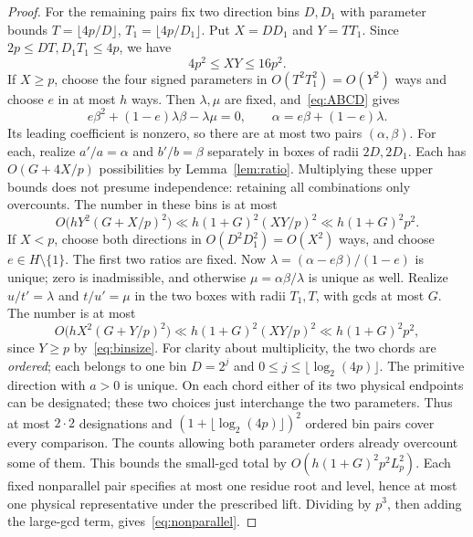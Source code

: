 \begin{proof}
For the remaining pairs fix two direction bins $D,D_1$ with parameter bounds $T=\lfloor4p/D\rfloor$, $T_1=\lfloor4p/D_1\rfloor$. Put $X=DD_1$ and $Y=TT_1$. Since $2p\le DT,D_1T_1\le4p$, we have
\begin{equation}\label{eq:binsize}
 4p^2\le XY\le16p^2.
\end{equation}
If $X\ge p$, choose the four signed parameters in $O(T^2T_1^2)=O(Y^2)$ ways and choose $e$ in at most $h$ ways. Then $\lambda,\mu$ are fixed, and~\eqref{eq:ABCD} gives
\[
 e\beta^2+(1-e)\lambda\beta-\lambda\mu=0,\qquad \alpha=e\beta+(1-e)\lambda.
\]
Its leading coefficient is nonzero, so there are at most two pairs $(\alpha,\beta)$. For each, realize $a'/a=\alpha$ and $b'/b=\beta$ separately in boxes of radii $2D,2D_1$. Each has $O(G+4X/p)$ possibilities by Lemma~\ref{lem:ratio}. Multiplying these upper bounds does not presume independence: retaining all combinations only overcounts. The number in these bins is at most
\[
 O\big(hY^2(G+X/p)^2\big)\ll h(1+G)^2(XY/p)^2\ll h(1+G)^2p^2.
\]
If $X<p$, choose both directions in $O(D^2D_1^2)=O(X^2)$ ways, and choose $e\in H\setminus\{1\}$. The first two ratios are fixed. Now $\lambda=(\alpha-e\beta)/(1-e)$ is unique; zero is inadmissible, and otherwise $\mu=\alpha\beta/\lambda$ is unique as well. Realize $u/t'=\lambda$ and $t/u'=\mu$ in the two boxes with radii $T_1,T$, with gcds at most $G$. The number is at most
\[
 O\big(hX^2(G+Y/p)^2\big)\ll h(1+G)^2(XY/p)^2\ll h(1+G)^2p^2,
\]
since $Y\ge p$ by~\eqref{eq:binsize}. For clarity about multiplicity, the two chords are \emph{ordered}; each belongs to one bin $D=2^j$ and $0\le j\le\lfloor\log_2(4p)\rfloor$. The primitive direction with $a>0$ is unique. On each chord either of its two physical endpoints can be designated; these two choices just interchange the two parameters. Thus at most $2\cdot2$ designations and $(1+\lfloor\log_2(4p)\rfloor)^2$ ordered bin pairs cover every comparison. The counts allowing both parameter orders already overcount some of them. This bounds the small-gcd total by $O(h(1+G)^2p^2L_p^2)$. Each fixed nonparallel pair specifies at most one residue root and level, hence at most one physical representative under the prescribed lift. Dividing by $p^3$, then adding the large-gcd term, gives~\eqref{eq:nonparallel}.
\end{proof}

